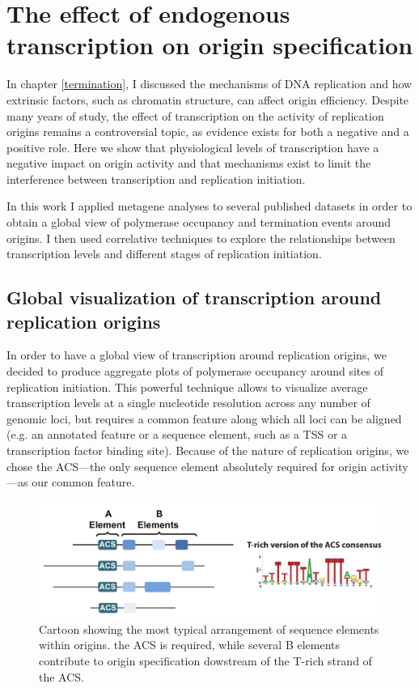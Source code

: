 \chapter{The effect of endogenous transcription on origin specification}


In chapter \ref{termination}, I discussed the mechanisms of DNA replication and how extrinsic factors, such as chromatin structure, can affect origin efficiency. Despite many years of study, the effect of transcription on the activity of replication origins remains a controversial topic, as evidence exists for both a negative and a positive role. 
Here we show that physiological levels of transcription have a negative impact on origin activity and that mechanisms exist to limit the interference between transcription and replication initiation.

In this work I applied metagene analyses to several published datasets in order to obtain a global view of polymerase occupancy and termination events around origins. I then used correlative techniques to explore the relationships between transcription levels and different stages of replication initiation. 

\section{Global visualization of transcription around replication origins}

In order to have a global view of transcription around replication origins, we decided to produce aggregate plots of polymerase occupancy around sites of replication initiation. This powerful technique allows to visualize average transcription levels at a single nucleotide resolution across any number of genomic loci, but requires a common feature along which all loci can be aligned (e.g. an annotated feature or a sequence element, such as a TSS or a transcription factor binding site). Because of the nature of replication origins, we chose the ACS—the only sequence element absolutely required for origin activity—as our common feature. 

\begin{figure}[ht]

\centering
\includegraphics[width=\textwidth]{figures/results/acs}
\caption[ACS consensus an arrangement relative to other origin DNA elements]{Cartoon showing the most typical arrangement of sequence elements within origins. the ACS is required, while several B elements contribute to origin specification dowstream of the T-rich strand of the ACS.}
\label{fig:originSchema}

\end{figure}

